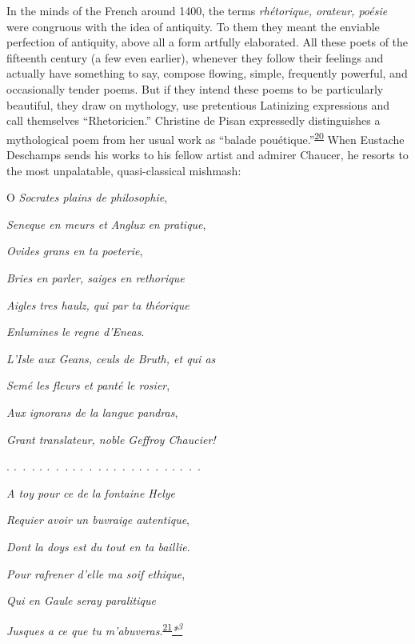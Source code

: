 In the minds of the French around 1400, the terms \emph{rhétorique,
orateur, poésie} were congruous with the idea of antiquity. To them they
meant the enviable perfection of antiquity, above all a form artfully
elaborated. All these poets of the fifteenth century (a few even
earlier), whenever they follow their feelings and actually have
something to say, compose flowing, simple, frequently powerful, and
occasionally tender poems. But if they intend these poems to be
particularly beautiful, they draw on mythology, use pretentious
Latinizing expressions and call themselves ``Rhetoricien.'' Christine de
Pisan expressedly distinguishes a mythological poem from her usual work
as ``balade
pouétique.''\textsuperscript{\protect\hypertarget{22_Chapter_Fourteen__THE_COMING_OF.xhtmlux5cux23id_84}{\protect\hyperlink{23_NOTES.xhtmlux5cux23id_85}{20}}}
When Eustache Deschamps sends his works to his fellow artist and admirer
Chaucer, he resorts to the most unpalatable, quasi-classical mishmash:

O \emph{Socrates plains de philosophie},

\emph{Seneque en meurs et Anglux en pratique},

\emph{Ovides grans en ta poeterie},

\emph{Bries en parler, saiges en rethorique}

\emph{Aigles tres haulz, qui par ta théorique}

\emph{Enlumines le regne d'Eneas}.

\emph{L'Isle aux Geans, ceuls de Bruth, et qui as}

\emph{Semé les fleurs et panté le rosier},

\emph{Aux ignorans de la langue pandras},

\emph{Grant translateur, noble Geffroy Chaucier!}

. \emph{.~.~. . .~.~. . .~.~. . .~.~. . .~.~. . .~.~}.

\emph{\protect\hypertarget{22_Chapter_Fourteen__THE_COMING_OF.xhtmlux5cux23page_388}{}{}A
toy pour ce de la fontaine Helye}

\emph{Requier avoir un buvraige autentique},

\emph{Dont la doys est du tout en ta baillie}.

\emph{Pour rafrener d'elle ma soif ethique},

\emph{Qui en Gaule seray paralitique}

\emph{Jusques a ce que tu
m'abuveras}.\textsuperscript{\protect\hypertarget{22_Chapter_Fourteen__THE_COMING_OF.xhtmlux5cux23id_82}{\protect\hyperlink{23_NOTES.xhtmlux5cux23id_83}{21}}}\emph{\protect\hypertarget{22_Chapter_Fourteen__THE_COMING_OF.xhtmlux5cux23id_2799}{\protect\hyperlink{23_NOTES.xhtmlux5cux23id_2800}{*\textsuperscript{3}}}}

